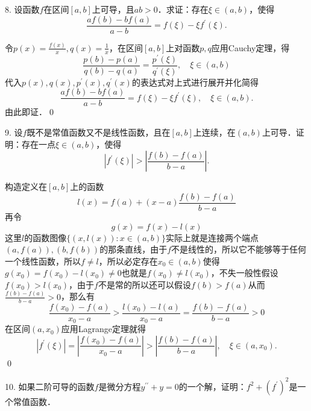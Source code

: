 8. 设函数$f$在区间$[a,b]$上可导，且$ab>0$．求证：存在$\xi \in (a,b)$，使得
\begin{equation*}
    \frac{af(b)-bf(a)}{a-b} = f(\xi) - \xi f^{\prime}(\xi).
\end{equation*}

\prove 令$p(x) = \displaystyle\frac{f(x)}{x}, q(x) = \frac{1}{x}$，在区间$[a,b]$上对函数$p,q$应用Cauchy定理，得
\begin{equation}
    \frac{p(b)-p(a)}{q(b)-q(a)} = \frac{p^{\prime}(\xi)}{q^{\prime}(\xi)}, \quad \xi \in (a,b)
\end{equation}
代入$p(x),q(x),p^\prime (x), q^\prime (x)$的表达式对上式进行展开并化简得
\begin{equation}
    \frac{af(b)-bf(a)}{a-b} = f(\xi) - \xi f^{\prime}(\xi), \quad \xi \in (a,b).
\end{equation}
由此即证．\qed\bigskip

9. 设$f$既不是常值函数又不是线性函数，且在$[a,b]$上连续，在$(a,b)$上可导．证明：存在一点$\xi \in (a,b)$，使得
\begin{equation*}
    \left| f^{\prime}\left(\xi\right) \right| > \left| \frac{f(b)-f(a)}{b-a} \right|.
\end{equation*}

\prove 构造定义在$[a,b]$上的函数
\begin{equation}
    l(x) = f(a) + \left(x-a\right) \frac{f(b)-f(a)}{b-a}
\end{equation}
再令
\begin{equation}
    g(x) = f(x) - l(x)
\end{equation}
这里$l$的函数图像$\{ (x, l(x)) : x \in (a,b) \}$实际上就是连接两个端点$(a,f(a)), (b,f(b))$的那条直线，由于$f$不是线性的，所以它不能够等于任何一个线性函数，所以$f \neq l$，所以必定存在$x_0 \in (a,b)$使得$g(x_0)=f(x_0)-l(x_0) \neq 0$也就是$f(x_0) \neq l(x_0)$，不失一般性假设$f(x_0) > l(x_0)$，由于$f$不是常的所以还可以假设$f(b)>f(a)$从而$\displaystyle\frac{f(b)-f(a)}{b-a}>0$，那么有
\begin{equation}
    \frac{f(x_0)-f(a)}{x_0-a} > \frac{l(x_0)-l(a)}{x_0-a} = \frac{f(b)-f(a)}{b-a} > 0
\end{equation}
在区间$(a,x_0)$应用Lagrange定理就得
\begin{equation}
    \left| f^{\prime}(\xi) \right| = \left| \frac{f(x_0)-f(a)}{x_0-a} \right| > \left| \frac{f(b)-f(a)}{b-a} \right|, \quad \xi \in (a, x_0).
\end{equation}
\qed\bigskip

10. 如果二阶可导的函数$f$是微分方程$y^{\prime\prime}+y=0$的一个解，证明：$f^2+(f^\prime)^2$是一个常值函数．

